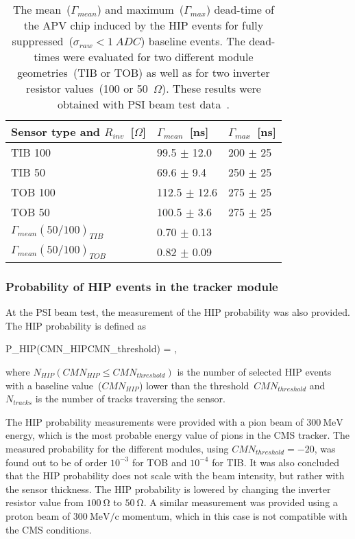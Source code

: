 \begin{table}[h]
\begin{center}
\begin{tabular}{|l|l|l|}
\hline
Sensor type and $R_{inv}$~[$\Omega$] & $\Gamma_{mean}$~[ns]  & $\Gamma_{max}$~[ns] \\
\hline
\hline
TIB 100 & 99.5 $\pm$ 12.0 & 200 $\pm$ 25 \\
TIB 50 & 69.6 $\pm$ 9.4 & 250 $\pm$ 25 \\
TOB 100 & 112.5 $\pm$ 12.6 & 275 $\pm$ 25 \\
TOB 50 & 100.5 $\pm$ 3.6 & 275 $\pm$ 25 \\
\hline
$\Gamma_{mean} (50/100)_{TIB}$&  0.70 $\pm$ 0.13  & \\
$\Gamma_{mean} (50/100)_{TOB}$&  0.82 $\pm$ 0.09 & \\
\hline
\end{tabular}
\caption[Table caption text]{The mean~($\Gamma_{mean}$) and maximum~($\Gamma_{max}$) dead-time of the APV chip induced by the HIP events for fully suppressed~($\sigma_{raw}<1~ADC$) baseline events. The dead-times were evaluated for two different module geometries~(TIB or TOB) as well as for two inverter resistor values~(100 or 50~$\Omega$). These results were obtained with PSI beam test data~\cite{Bainbridge:2004jc}. }
\label{tab:tableDeadtimes}
\end{center}
\end{table}



\subsubsection{Probability of HIP events in the tracker module~\label{sec:ProbPast}}

At the PSI beam test, the measurement of the HIP probability was also provided. The HIP probability is defined as 

{
P_{HIP}(CMN_{HIP}\leq CMN_{threshold}) = ,
}

where $N_{HIP}(CMN_{HIP}\leq CMN_{threshold})$ is the number of selected HIP events with a baseline value~($CMN_{HIP}$) lower than the threshold~$CMN_{threshold}$ and $N_{tracks}$ is the number of tracks traversing the sensor.

The HIP probability measurements were provided with a pion beam of $300~\mathrm{MeV}$ energy, which is the most probable energy value of pions in the CMS tracker. The measured probability for the different modules, using $CMN_{threshold}=-20$, was found out to be of order $10^{-3}$ for TOB and $10^{-4}$ for TIB. It was also concluded that the HIP probability does not scale with the beam intensity, but rather with the sensor thickness. The HIP probability is lowered by changing the inverter resistor value from $100~\mathrm{\Omega}$ to  $50~\mathrm{\Omega}$. A similar measurement was provided using a proton beam of  $300~\mathrm{MeV/c}$ momentum, which in this case is not compatible with the CMS conditions.



